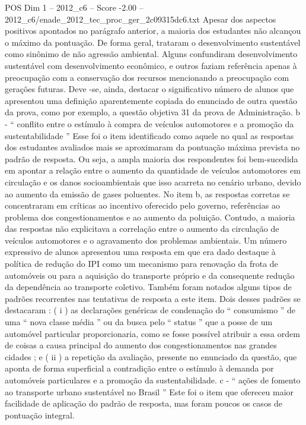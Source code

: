 \begin{textsample}{POS Dim 1 – 2012\_c6 – Score -2.00 – 2012\_c6/enade\_2012\_tec\_proc\_ger\_2c09315dc6.txt}
Apesar dos aspectos positivos apontados no parágrafo anterior, a maioria dos estudantes não alcançou o máximo da pontuação.
De forma geral, trataram o desenvolvimento sustentável como sinônimo de não agressão ambiental.
Alguns confundiram desenvolvimento sustentável com desenvolvimento econômico, e outros faziam referência apenas à preocupação com a conservação dos recursos mencionando a preocupação com gerações futuras.
Deve -se, ainda, destacar o significativo número de alunos que apresentou uma definição aparentemente copiada do enunciado de outra questão da prova, como por exemplo, a questão objetiva 31 da prova de Administração. b - “ conflito entre o estímulo à compra de veículos automotores e a promoção da sustentabilidade ” Esse foi o item identificado como aquele no qual as respostas dos estudantes avaliados mais se aproximaram da pontuação máxima prevista no padrão de resposta.
Ou seja, a ampla maioria dos respondentes foi bem-sucedida em apontar a relação entre o aumento da quantidade de veículos automotores em circulação e os danos socioambientais que isso acarreta no cenário urbano, devido ao aumento da emissão de gases poluentes.
No item b, as respostas corretas se concentraram em críticas ao incentivo oferecido pelo governo, referências ao problema dos congestionamentos e ao aumento da poluição.
Contudo, a maioria das respostas não explicitava a correlação entre o aumento da circulação de veículos automotores e o agravamento dos problemas ambientais.
Um número expressivo de alunos apresentou uma resposta em que era dado destaque à política de redução do IPI como um mecanismo para renovação da frota de automóveis ou para a aquisição do transporte próprio e da consequente redução da dependência ao transporte coletivo.
Também foram notados alguns tipos de padrões recorrentes nas tentativas de resposta a este item.
Dois desses padrões se destacaram : ( i ) as declarações genéricas de condenação do “ consumismo ” de uma “ nova classe média ” ou da busca pelo “ status ” que a posse de um automóvel particular proporcionaria, como se fosse possível atribuir a essa ordem de coisas a causa principal do aumento dos congestionamentos nas grandes cidades ; e ( ii ) a repetição da avaliação, presente no enunciado da questão, que aponta de forma superficial a contradição entre o estímulo à demanda por automóveis particulares e a promoção da sustentabilidade. c - “ ações de fomento ao transporte urbano sustentável no Brasil ” Este foi o item que ofereceu maior facilidade de aplicação do padrão de resposta, mas foram poucos os casos de pontuação integral.

\end{textsample}

